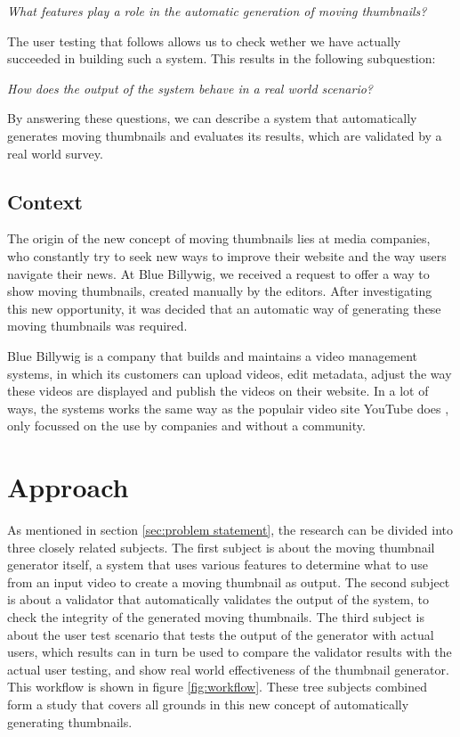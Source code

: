 \documentclass{../resources/acm_proc_article-sp}
\begin{document}
\textit{What features play a role in the automatic generation of moving thumbnails?}

The user testing that follows allows us to check wether we have actually succeeded in building such a system. This results in the following subquestion:

\textit{How does the output of the system behave in a real world scenario?}

By answering these questions, we can describe a system that automatically generates moving thumbnails and evaluates its results, which are validated by a real world survey.

\subsection{Context}

The origin of the new concept of moving thumbnails lies at media companies, who constantly try to seek new ways to improve their website and the way users navigate their news. At Blue Billywig, we received a request to offer a way to show moving thumbnails, created manually by the editors. After investigating this new opportunity, it was decided that an automatic way of generating these moving thumbnails was required.

Blue Billywig is a company that builds and maintains a video management systems, in which its customers can upload videos, edit metadata, adjust the way these videos are displayed and publish the videos on their website. In a lot of ways, the systems works the same way as the populair video site YouTube does \cite{YouTube:A-l2msAp}, only focussed on the use by companies and without a community.

\section{Approach}

As mentioned in section \ref{sec:problem statement}, the research can be divided into three closely related subjects. The first subject is about the moving thumbnail generator itself, a system that uses various features to determine what to use from an input video to create a moving thumbnail as output. The second subject is about a validator that automatically validates the output of the system, to check the integrity of the generated moving thumbnails. The third subject is about the user test scenario that tests the output of the generator with actual users, which results can in turn be used to compare the validator results with the actual user testing, and show real world effectiveness of the thumbnail generator. This workflow is shown in figure \ref{fig:workflow}. These tree subjects combined form a study that covers all grounds in this new concept of automatically generating thumbnails.
\end{document}
